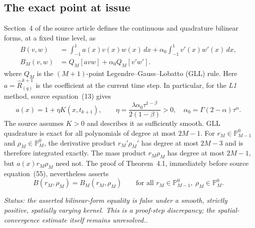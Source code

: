 \documentclass[11pt,a4paper]{amsart}
\theoremstyle{remark}
\theoremstyle{plain}
\theoremstyle{remark}
\newcommand{\auditstatus}[1]{\par\noindent\emph{#1.}\enspace}
\numberwithin{equation}{section}
\begin{document}
\subsection{The exact point at issue}
Section~4 of the source article defines the continuous and quadrature bilinear forms, at a fixed time level, as
\begin{equation}\label{eq:ob04-forms}
\begin{aligned}
 B(v,w)&=\int_{-1}^1 a(x)v(x)w(x)\,dx+\alpha_0\int_{-1}^1 v'(x)w'(x)\,dx,\\
 B_M(v,w)&=Q_M[avw]+\alpha_0 Q_M[v'w'].
\end{aligned}
\end{equation}
where $Q_M$ is the $(M+1)$-point Legendre--Gauss--Lobatto (GLL) rule. Here $a=\widehat R^{k+1}_{(q)}$ is the coefficient at the current time step. In particular, for the \emph{L1} method, source equation~(13) gives
\begin{equation}\label{eq:ob04-actual-coefficient}
 a(x)=1+\eta K(x,t_{k+1}),\qquad
 \eta=\frac{\lambda\alpha_0\tau^{1-\beta}}{2(1-\beta)}>0,
 \quad \alpha_0=\Gamma(2-\alpha)\tau^\alpha.
\end{equation}
The source assumes $K>0$ and describes it as sufficiently smooth. GLL quadrature is exact for all polynomials of degree at most $2M-1$. For $r_M\in\mathbb P^0_{M-1}$ and $\rho_M\in\mathbb P^0_M$, the derivative product $r_M'\rho_M'$ has degree at most $2M-3$ and is therefore integrated exactly. The mass product $r_M\rho_M$ has degree at most $2M-1$, but $a(x)r_M\rho_M$ need not. The proof of Theorem~4.1, immediately before source equation~(55), nevertheless asserts
\begin{equation}\label{eq:ob04-printed-equality}
 B(r_M,\rho_M)=B_M(r_M,\rho_M)\qquad\text{for all }r_M\in\mathbb P^0_{M-1},\ \rho_M\in\mathbb P^0_M.
\end{equation}
\auditstatus{Status: the asserted bilinear-form equality is false under a smooth, strictly positive, spatially varying kernel. This is a proof-step discrepancy; the spatial-convergence estimate itself remains unresolved.}
\end{document}

